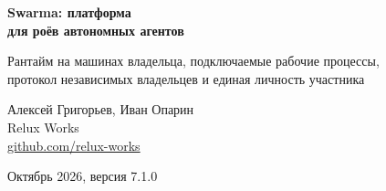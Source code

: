 \documentclass[10pt,a4paper]{article}
\begin{document}
\begin{center}
{\fontsize{17}{21}\selectfont\bfseries Swarma: платформа\\[2pt] для роёв автономных агентов\par}
\vspace{6pt}
{\normalsize Рантайм на машинах владельца, подключаемые рабочие процессы,\\ протокол независимых владельцев и единая личность участника\par}
\vspace{10pt}
{\normalsize Алексей Григорьев, Иван Опарин\\
Relux Works\\
\href{https://github.com/relux-works}{github.com/relux-works}\par}
\vspace{4pt}
{\normalsize Октябрь 2026, версия 7.1.0\par}
\end{center}

\vspace{6pt}
\end{document}
